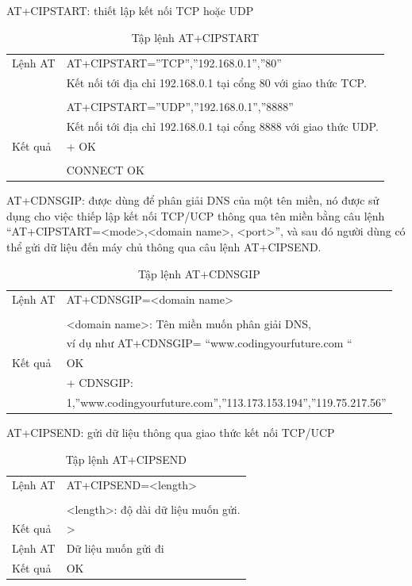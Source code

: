 AT+CIPSTART: thiết lập kết nối TCP hoặc UDP
\begin{table}[H]
	\label{table:AT+CIPSTART}
	\begin{tabular}{|l|l|}
		\hline
		Lệnh AT & AT+CIPSTART=”TCP”,”192.168.0.1”,”80” \\ 
		& Kết nối tới địa chỉ 192.168.0.1 tại cổng 80 với giao thức TCP.\\
		& \\
		& AT+CIPSTART=”UDP”,”192.168.0.1”,”8888” \\ 
		& Kết nối tới địa chỉ 192.168.0.1 tại cổng 8888 với giao thức UDP.\\ \hline
		Kết quả  &+ OK \\
		& \\
		& CONNECT OK\\\hline
	\end{tabular}
	
	\caption[Tập lệnh AT+CIPSTART: thiết lập kết nối TCP hoặc UDP]{Tập lệnh AT+CIPSTART}
\end{table}


AT+CDNSGIP: được dùng để phân giải DNS của một tên miền, nó được sử dụng cho việc thiếp lập kết nối TCP/UCP thông qua tên miền bằng câu lệnh “AT+CIPSTART=<mode>,<domain name>, <port>”, và sau đó người dùng có thể gửi dữ liệu đến máy chủ thông qua câu lệnh AT+CIPSEND.
\begin{table}[H]
	\label{table:AT+CDNSGIP}
	\begin{tabular}{|l|l|}
		\hline
		Lệnh AT & AT+CDNSGIP=<domain name> \\ 
		& \\
		& <domain name>: Tên miền muốn phân giải DNS, \\
		
		& ví dụ như AT+CDNSGIP= “www.codingyourfuture.com “\\ \hline
		Kết quả  &OK \\
		&+ CDNSGIP:\\
		&1,”www.codingyourfuture.com”,”113.173.153.194”,”119.75.217.56”\\\hline
	\end{tabular}
	
	\caption[Tập lệnh AT+CDNSGIP: phân giải DNS tên miền]{Tập lệnh AT+CDNSGIP}
\end{table}




AT+CIPSEND: gửi dữ liệu thông qua giao thức kết nối TCP/UCP
\begin{table}[H]
	\label{table:AT+CIPSEND}
	\begin{tabular}{|l|l|}
		\hline
		Lệnh AT & AT+CIPSEND=<length> \\ 
		& \\
		& <length>: độ dài dữ liệu muốn gửi.\\\hline
		Kết quả  & >  \\ \hline
		Lệnh AT & Dữ liệu muốn gửi đi \\ \hline
		Kết quả  & OK  \\ \hline
	\end{tabular}
	
	\caption[Tập lệnh AT+CIPSEND: gửi dữ liệu qua giao thức TCP/UCP]{Tập lệnh AT+CIPSEND}
\end{table}



